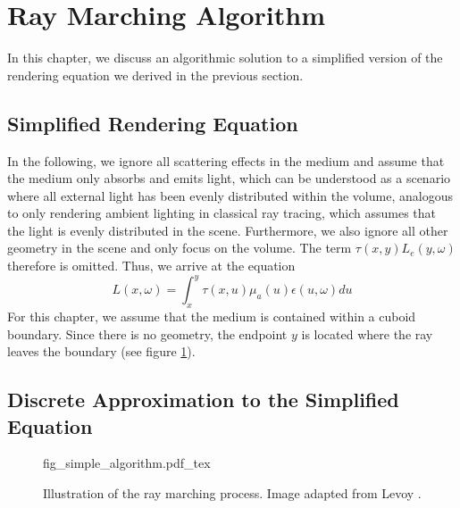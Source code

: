\section{Ray Marching Algorithm}
\label{sec:ray_marching}
In this chapter, we discuss an algorithmic solution\cite{511, 10.1145/147130.147155} to a simplified version of the rendering equation we derived in the previous section.
\subsection{Simplified Rendering Equation}
In the following, we ignore all scattering effects in the medium and assume that the medium only absorbs and emits light\cite{10.1145/147130.147155}, which can be understood as a scenario where all external light has been evenly distributed within the volume, analogous to only rendering ambient lighting in classical ray tracing, which assumes that the light is evenly distributed in the scene.
Furthermore, we also ignore all other geometry in the scene and only focus on the volume. The term $\tau({x}, {y}) L_e({y}, \omega )$ therefore is omitted.
Thus, we arrive at the equation
\begin{equation} \label{eq:simplified_req}
L({x}, \omega ) = \int_{{x}}^{{y}} \tau({x}, {u}){\mu}_a({u})\epsilon ({u}, \omega)d{u}
\end{equation}
For this chapter, we assume that the medium is contained within a cuboid boundary\cite{10.1145/147130.147155, 10.1145/78964.78965}. Since there is no geometry, the endpoint $y$ is located where the ray leaves the boundary (see figure \ref{fig:simple_algorithm}).

\subsection{Discrete Approximation to the Simplified Equation}
\label{subsec:discrete_marching}
\begin{figure}
\centering
\def\svgwidth{\columnwidth}
{fig_simple_algorithm.pdf_tex}

\caption{Illustration of the ray marching process. Image adapted from Levoy \cite{10.1145/78964.78965}.}
\label{fig:simple_algorithm}
\end{figure}



